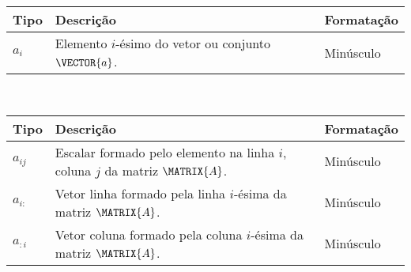 \newpage
\begin{notation}
\begin{tabular}{p{} | p{} | p{}}
\hline	
\textbf{Tipo} & \textbf{Descrição} & \textbf{Formatação} \\ \hline
$a_{i}$ & Elemento $i$-ésimo do vetor ou conjunto  $\VECTOR{a}$.& Minúsculo \\
\hline
\end{tabular}
\end{notation}


\begin{notation}~\\
\begin{tabular}{p{} | p{} | p{}}
\hline	
\textbf{Tipo} & \textbf{Descrição} & \textbf{Formatação} \\ \hline
$a_{ij}$ & Escalar formado pelo elemento na linha $i$, coluna $j$ da matriz $\MATRIX{A}$. & Minúsculo \\ \hline
$a_{i:}$ & Vetor linha formado pela linha $i$-ésima da matriz $\MATRIX{A}$.  & Minúsculo \\
$a_{:i}$ & Vetor coluna formado pela coluna $i$-ésima da matriz $\MATRIX{A}$.  & Minúsculo \\
\hline
\end{tabular}
\end{notation}


